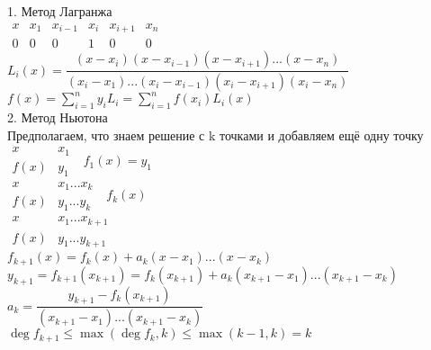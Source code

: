 
1. Метод Лагранжа \\
$ \begin{array}{c|ccccc}
x & x_1 & x_{i-1} & x_i & x_{i+1} & x_n \\
\hline
0 & 0 & 0 & 1 & 0 & 0 
\end{array} $\\
$ L_i (x) = \dfrac{(x - x_i) (x - x_{i-1} ) (x - x_{i+1}) ... (x - x_n)}{ (x_i - x_1)...(x_i - x_{i-1}) (x_i - x_{i+1}) (x_i - x_n)} $ \\
$ f(x) = \sum_{i=1}^n y_i L_i = \sum_{i=1}^n f(x_i) L_i (x) $ \\
2. Метод Ньютона \\
Предполагаем, что знаем решение с k точками и добавляем ещё одну точку \\
$ \begin{array}{c|c}
x & x_1 \\
\hline 
f(x) & y_1
\end{array} \ \ \ f_1(x) = y_1 $ \\
$ \begin{array}{c|c}
x & x_1...x_k \\
\hline 
f(x) & y_1...y_k
\end{array} \ \ \ f_k (x) $ \\
$ \begin{array}{c|c}
x & x_1...x_{k+1} \\
\hline 
f(x) & y_1...y_{k+1}
\end{array} $ \\
$ f_{k+1} (x) = f_k(x) + a_k(x - x_1) ... (x - x_k) $ \\
$ y_{k+1} = f_{k+1} (x_{k+1}) = f_k(x_{k+1}) +  a_k(x_{k+1} - x_1) ... (x_{k+1} - x_k) $ \\
$ a_k = \dfrac{y_{k+1} - f_k(x_{k+1})}{(x_{k+1} - x_1) ... (x_{k+1} - x_k)} $ \\
$ \deg f_{k+1} \leq \max(\deg f_{k}, k) \leq \max (k-1, k) = k $ \\















